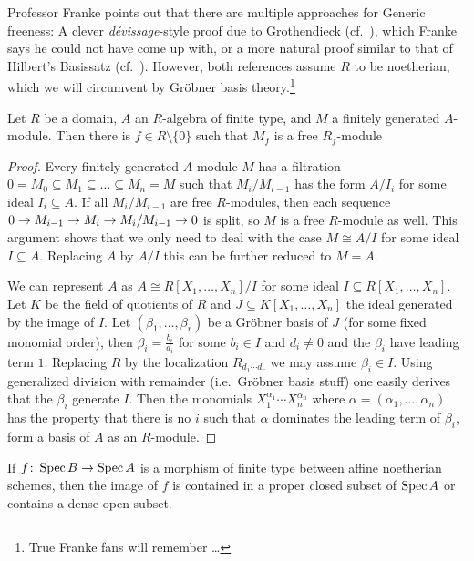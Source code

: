 \documentclass[a4paper,parskip=half,numbers=enddot, DIV=12]{scrreprt}
\begin{document}
Professor Franke points out that there are multiple approaches for Generic freeness: A clever \emph{dévissage}-style proof due to Grothendieck (cf.\ \cite[Theorem~14.4]{eisenbudCommAlg}), which Franke says he could not have come up with, or a more natural proof similar to that of Hilbert's Basissatz (cf.\ \cite[\S 24]{matsumuraCRT}). However, both references assume $R$ to be noetherian, which we will circumvent by Gröbner basis theory.\footnote{True Franke fans will remember \ldots}
\begin{prop}
	Let $R$ be a domain, $A$ an $R$-algebra of finite type, and $M$ a finitely generated $A$-module. Then there is $f\in R\setminus\{0\}$ such that $M_f$ is a free $R_f$-module
\end{prop}
\begin{proof}
	Every finitely generated $A$-module $M$ has a filtration $0=M_0\subseteq M_1\subseteq \ldots\subseteq M_n=M$ such that $M_i/M_{i-1}$ has the form $A/I_i$ for some ideal $I_i\subseteq A$. If all $M_i/M_{i-1}$ are free $R$-modules, then each sequence $0\morphism M_{i-1}\morphism M_i\morphism M_i/M_{i-1}\morphism 0$ is split, so $M$ is a free $R$-module as well. This argument shows that we only need to deal with the case $M\cong A/I$ for some ideal $I\subseteq A$. Replacing $A$ by $A/I$ this can be further reduced to $M=A$.
	
	We can represent $A$ as $A\cong R[X_1,\ldots,X_n]/I$ for some ideal $I\subseteq R[X_1,\ldots,X_n]$. Let $K$ be the field of quotients of $R$ and $J\subseteq K[X_1,\ldots,X_n]$ the ideal generated by the image of $I$. Let $(\beta_1,\ldots,\beta_r)$ be a Gröbner basis of $J$ (for some fixed monomial order), then $\beta_i=\frac{b_i}{d_i}$ for some $b_i\in I$ and $d_i\neq 0$ and the $\beta_i$ have leading term $1$. Replacing $R$ by the localization $R_{d_1\cdots d_r}$ we may assume $\beta_i\in I$. Using generalized division with remainder (i.e.\ Gröbner basis stuff) one easily derives that the $\beta_i$ generate $I$. Then the monomials $X_1^{\alpha_1}\cdots X_n^{\alpha_n}$ where $\alpha=(\alpha_1,\ldots,\alpha_n)$ has the property that there is no $i$ such that $\alpha$ dominates the leading term of $\beta_i$, form a basis of $A$ as an $R$-module.
\end{proof}
\begin{prop}
	If $f\colon \Spec B\morphism\Spec A$ is a morphism of finite type between affine noetherian schemes, then the image of $f$ is contained in a proper closed subset of $\operatorname{Spec} A$ or contains a dense open subset.
\end{prop}
\end{document}
